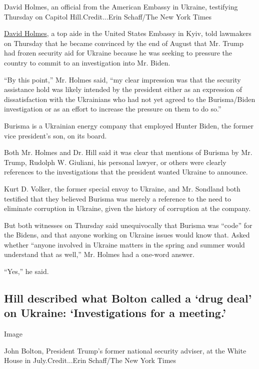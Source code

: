 David Holmes, an official from the American Embassy in Ukraine,
testifying Thursday on Capitol Hill.Credit...Erin Schaff/The New York
Times

\href{https://www.nytimes3xbfgragh.onion/2019/11/21/us/politics/david-holmes-impeachment.html}{David
Holmes}, a top aide in the United States Embassy in Kyiv, told lawmakers
on Thursday that he became convinced by the end of August that Mr. Trump
had frozen security aid for Ukraine because he was seeking to pressure
the country to commit to an investigation into Mr. Biden.

``By this point,'' Mr. Holmes said, ``my clear impression was that the
security assistance hold was likely intended by the president either as
an expression of dissatisfaction with the Ukrainians who had not yet
agreed to the Burisma/Biden investigation or as an effort to increase
the pressure on them to do so.''

Burisma is a Ukrainian energy company that employed Hunter Biden, the
former vice president's son, on its board.

Both Mr. Holmes and Dr. Hill said it was clear that mentions of Burisma
by Mr. Trump, Rudolph W. Giuliani, his personal lawyer, or others were
clearly references to the investigations that the president wanted
Ukraine to announce.

Kurt D. Volker, the former special envoy to Ukraine, and Mr. Sondland
both testified that they believed Burisma was merely a reference to the
need to eliminate corruption in Ukraine, given the history of corruption
at the company.

But both witnesses on Thursday said unequivocally that Burisma was
``code'' for the Bidens, and that anyone working on Ukraine issues would
know that. Asked whether ``anyone involved in Ukraine matters in the
spring and summer would understand that as well,'' Mr. Holmes had a
one-word answer.

``Yes,'' he said.

\hypertarget{hill-described-what-bolton-called-a-drug-deal-on-ukraine-investigations-for-a-meeting}{%
\subsection{Hill described what Bolton called a `drug deal' on Ukraine:
`Investigations for a
meeting.'}\label{hill-described-what-bolton-called-a-drug-deal-on-ukraine-investigations-for-a-meeting}}

Image

John Bolton, President Trump's former national security adviser, at the
White House in July.Credit...Erin Schaff/The New York Times

